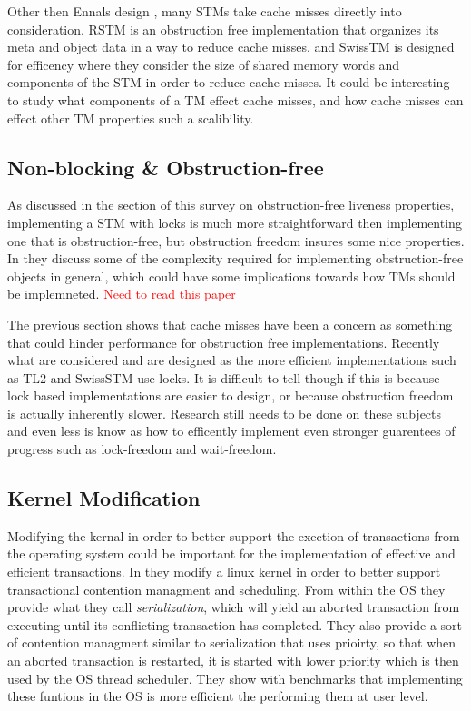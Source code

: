 Other then Ennals design \cite{Ennals05efficientsoftware}, many STMs take cache misses directly into consideration.
RSTM \cite{Marathe06loweringthe} is an obstruction free implementation that organizes its meta and object data in a way to reduce cache misses, and SwissTM \cite{1542494} is designed for efficency where they consider the size of shared memory words and components of the STM in order to reduce cache misses.
It could be interesting to study what components of a TM effect cache misses, and how cache misses can effect other TM properties such a scalibility.

\subsection{Non-blocking \& Obstruction-free}
As discussed in the section of this survey on obstruction-free liveness properties, implementing a STM with locks is much more straightforward then implementing one that is obstruction-free, but obstruction freedom insures some nice properties.
In \cite{1538908} they discuss some of the complexity required for implementing obstruction-free objects in general, which could have some implications towards how TMs should be implemneted.
\textcolor{Red}{Need to read this paper}

The previous section shows that cache misses have been a concern as something that could hinder performance for obstruction free implementations.
Recently what are considered and are designed as the more efficient implementations such as TL2 \cite{Dice06transactionallocking} and SwissSTM \cite{1542494} use locks.
It is difficult to tell though if this is because lock based implementations are easier to design, or because obstruction freedom is actually inherently slower.
Research still needs to be done on these subjects and even less is know as how to efficently implement even stronger guarentees of progress such as lock-freedom and wait-freedom.

\subsection{Kernel Modification}
Modifying the kernal in order to better support the exection of transactions from the operating system could be important for the implementation of effective and efficient transactions.
In \cite{1693465} they modify a linux kernel in order to better support transactional contention managment and scheduling.
From within the OS they provide what they call \emph{serialization}, which will yield an aborted transaction from executing until its conflicting transaction has completed.
They also provide a sort of contention managment similar to serialization that uses prioirty, so that when an aborted transaction is restarted, it is started with lower priority which is then used by the OS thread scheduler.
They show with benchmarks that implementing these funtions in the OS is more efficient the performing them at user level.

